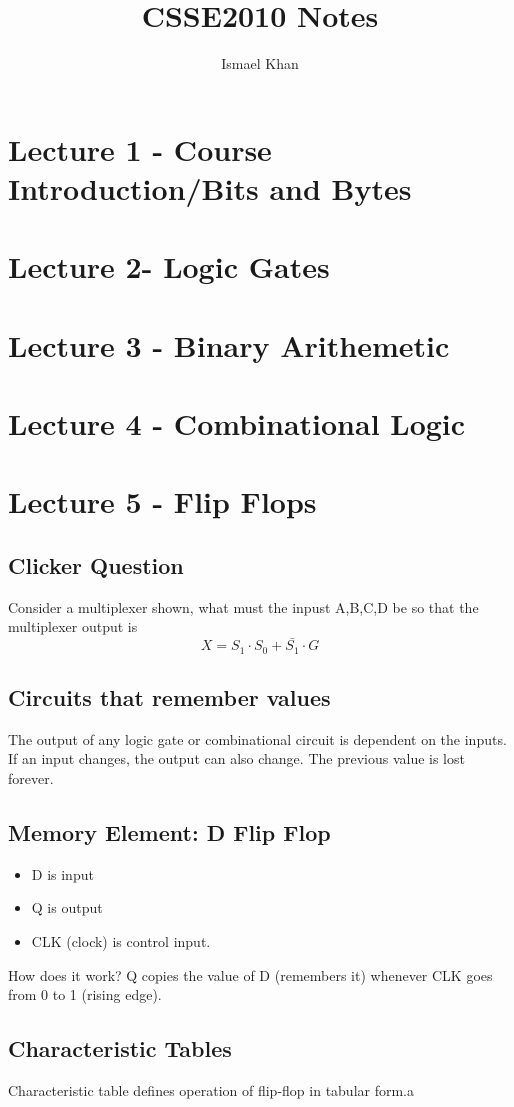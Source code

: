 \documentclass{article}
\title{CSSE2010 Notes}
\author{Ismael Khan}
\theoremstyle{definition}
\begin{document}
\section{Lecture 1 - Course Introduction/Bits and Bytes}
\section{Lecture 2- Logic Gates}
\section{Lecture 3 - Binary Arithemetic}
\section{Lecture 4 - Combinational Logic}
\section{Lecture 5 - Flip Flops}
\subsection{Clicker Question}
Consider a multiplexer shown, what must the inpust A,B,C,D be so that the
multiplexer output is 
$$ X = S_1\cdot S_0 + \bar{S_1} \cdot G $$
\subsection{Circuits that remember values}
The output of any logic gate or combinational circuit is dependent on the
inputs. If an input changes, the output can also change. The previous value is
lost forever.

\subsection{Memory Element: D Flip Flop}
\begin{itemize}
  \item D is input
  \item Q is output
  \item CLK (clock) is control input.
\end{itemize}
How does it work? Q copies the value of D (remembers it) whenever CLK goes from
0 to 1 (rising edge).
\subsection{Characteristic Tables}
Characteristic table defines operation of flip-flop in tabular form.a
\end{document}
